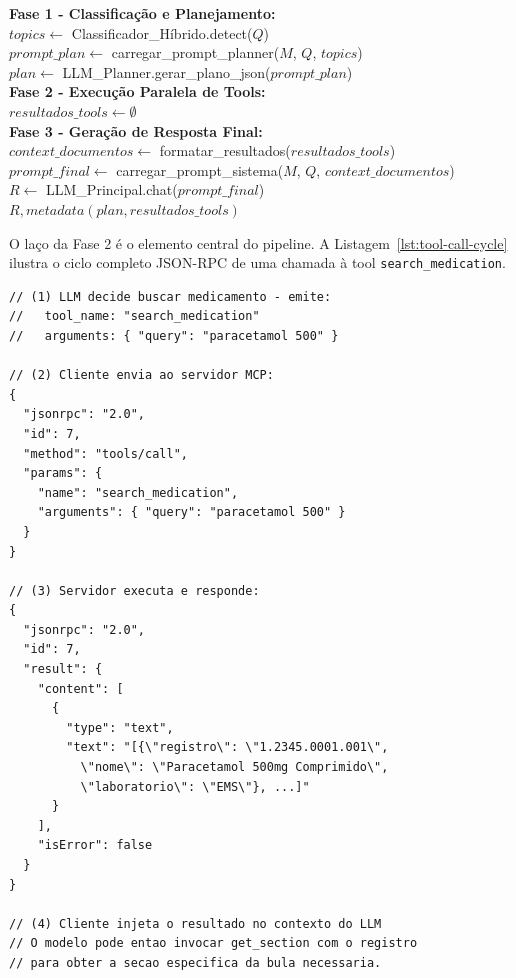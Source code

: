 \documentclass[12pt]{article}
\begin{document}
\begin{center}
\begin{framed}
\noindent
\begin{algorithm}[H]
\caption{Pipeline de Consulta com Planner e Execução Paralela}
\label{alg:mcp-query}
\BlankLine
\textbf{Fase 1 - Classificação e Planejamento:}\\
$topics \gets$ Classificador\_Híbrido.detect($Q$)\\
$prompt\_plan \gets$ carregar\_prompt\_planner($M$, $Q$, $topics$)\\
$plan \gets$ LLM\_Planner.gerar\_plano\_json($prompt\_plan$)\\
\BlankLine
\textbf{Fase 2 - Execução Paralela de Tools:}\\
$resultados\_tools \gets \emptyset$\\
\BlankLine
\textbf{Fase 3 - Geração de Resposta Final:}\\
$context\_documentos \gets$ formatar\_resultados($resultados\_tools$)\\
$prompt\_final \gets$ carregar\_prompt\_sistema($M$, $Q$, $context\_documentos$)\\
$R \gets$ LLM\_Principal.chat($prompt\_final$)\\
\BlankLine
\Return $R, metadata(plan, resultados\_tools)$
\end{algorithm}
\end{framed}
\end{center}

O laço da Fase 2 é o elemento central do pipeline. A Listagem~\ref{lst:tool-call-cycle} ilustra o ciclo completo JSON-RPC de uma chamada à tool \texttt{search\_medication}.

\begin{lstlisting}[caption={Ciclo JSON-RPC completo de uma chamada de tool}, label={lst:tool-call-cycle}]
// (1) LLM decide buscar medicamento - emite:
//   tool_name: "search_medication"
//   arguments: { "query": "paracetamol 500" }

// (2) Cliente envia ao servidor MCP:
{
  "jsonrpc": "2.0",
  "id": 7,
  "method": "tools/call",
  "params": {
    "name": "search_medication",
    "arguments": { "query": "paracetamol 500" }
  }
}

// (3) Servidor executa e responde:
{
  "jsonrpc": "2.0",
  "id": 7,
  "result": {
    "content": [
      {
        "type": "text",
        "text": "[{\"registro\": \"1.2345.0001.001\",
          \"nome\": \"Paracetamol 500mg Comprimido\",
          \"laboratorio\": \"EMS\"}, ...]"
      }
    ],
    "isError": false
  }
}

// (4) Cliente injeta o resultado no contexto do LLM
// O modelo pode entao invocar get_section com o registro
// para obter a secao especifica da bula necessaria.
\end{lstlisting}
\end{document}
